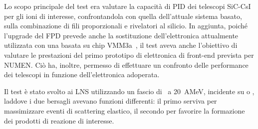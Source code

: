 Lo scopo principale del test era valutare la capacità di PID dei telescopi SiC-CsI per gli ioni di interesse, confrontandola con quella dell'attuale sistema basato, sulla combinazione di fili proporzionali e rivelatori al silicio.
In aggiunta, poiché l'upgrade del FPD prevede anche la sostituzione dell'elettronica attualmente utilizzata con una basata su chip VMM3a~\cite{degeronimo:ieee13}, il test aveva anche l'obiettivo di valutare le prestazioni del primo prototipo di elettronica di front-end prevista per NUMEN.
Ciò ha, inoltre, permesso di effettuare un confronto delle performance dei telescopi in funzione dell'elettronica adoperata.

Il test è stato svolto ai LNS utilizzando un fascio di~ a 20~AMeV, incidente su  o , laddove i due bersagli avevano funzioni differenti: il primo serviva per massimizzare eventi di scattering elastico, il secondo per favorire la formazione dei prodotti di reazione di interesse.






\subsection{}

